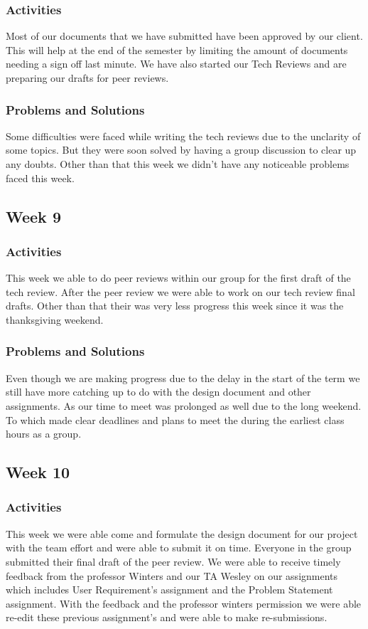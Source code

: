 \documentclass[journal,10pt,onecolumn,compsoc]{IEEEtran} \usepackage[margin=1.0in]{geometry} \usepackage{pdfpages}
\begin{document}
    \subsubsection{Activities}
    Most of our documents that we have submitted have been approved by our client. This will help at the end of the semester by limiting the amount of documents needing a sign off last minute. We have also started our Tech Reviews and are preparing our drafts for peer reviews.
    \subsubsection{Problems and Solutions}
    Some difficulties were faced while writing the tech reviews due to the unclarity of some topics. But they were soon solved by having a group discussion to clear up any doubts. Other than that this week we didn't have any noticeable problems faced this week. 
    
\subsection{Week 9}
    \subsubsection{Activities}
    This week we able to do peer reviews within our group for the first draft of the tech review. After the peer review we were able to work on our tech review final drafts. Other than that their was very less progress this week since it was the thanksgiving weekend.
    \subsubsection{Problems and Solutions}
    Even though we are making progress due to the delay in the start of the term we still have more catching up to do with the design document and other assignments. As our time to meet was prolonged as well due to the long weekend. To which made clear deadlines and plans to meet the during the earliest class hours as a group.
    
\subsection{Week 10}
    \subsubsection{Activities}
    This week we were able come and formulate the design document for our project with the team effort and were able to submit it on time. Everyone in the group submitted their final draft of the peer review. We were able to receive timely feedback from the professor Winters and our TA Wesley on our assignments which includes User Requirement's assignment and the Problem Statement assignment. With the feedback and the professor winters permission we were able re-edit these previous assignment's and were able to make re-submissions.
\end{document}
